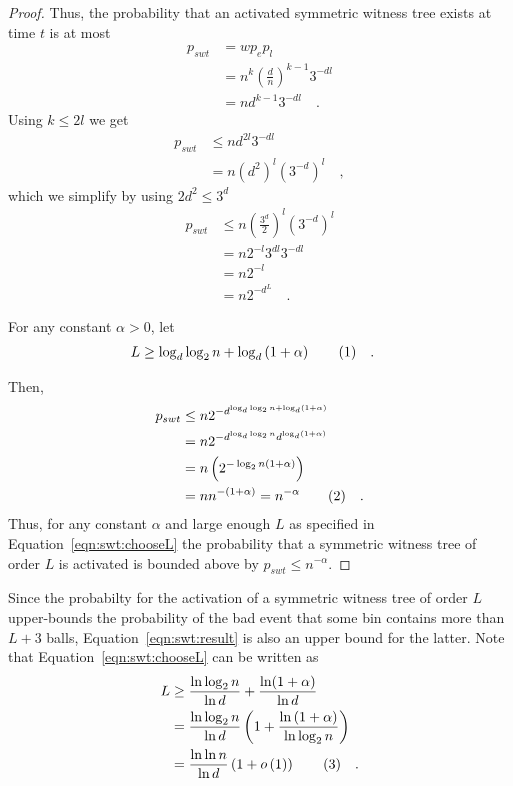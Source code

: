 \documentclass[a4paper,12pt]{article}
\newcommand\numberthis{\addtocounter{equation}{1}\tag{\theequation}}
\newcommand\neqn[1]{\numberthis\label{eqn:#1}}
\begin{document}
\begin{proof}
Thus, the probability that an activated symmetric witness tree exists at time $t$ is at most 
\begin{align*}
p_{swt} &= w  p_e  p_l \\
		&= n^{k}  \left(\frac{d}{n}\right)^{k-1}  3^{-d  l} \\
		&= n  d^{k-1}  3^{-d  l}\quad .
\end{align*}
Using $k \leq 2l$ we get
\begin{align*}
p_{swt} &\leq n  d^{2 l}  3^{-d  l} \\
		&= n  \left(d^2\right)^l  \left( 3^{-d} \right)^l\quad ,
\end{align*}
which we simplify by using $2d^2 \leq 3^d$
\begin{align*}
p_{swt} &\leq n  \left(\frac{3^d}{2}\right)^l  \left( 3^{-d}\right)^l \\
		&= n  2^{-l}  3^{d l}  3^{-d  l} \\
		&= n 2^{-l}		\\
		&= n 2^{-d^L} \quad .		
\end{align*}

For any constant $\alpha > 0 $, let
\begin{align*}
L &\geq \log_d\log_2 n + \log_d\left(1+\alpha\right) \neqn{swt:chooseL} \quad .
\end{align*}

Then, 
\begin{align*}
p_{swt} &\leq n  2^{{-d}^{\log_d\log_2 n + \log_d\left(1+\alpha\right)}} \\
		&= n  2^{-{d}^{\log_d\log_2 n} d^{\log_d \left(1+\alpha\right)}} \\
		&= n  \left( 2^{-\log_2 n  \left(1+ \alpha \right)} \right) \\
		&= n  n^{-\left(1+\alpha\right)} = n^{-\alpha} \neqn{swt:result}\quad .
\end{align*}
Thus, for any constant $\alpha$ and large enough $L$ as specified in Equation~\ref{eqn:swt:chooseL} the probability that a symmetric witness tree of order $L$ is activated is bounded above by $p_{swt }\leq n^{-\alpha}$.
\end{proof}

Since the probabilty for the activation of a symmetric witness tree of order $L$ upper-bounds the probability of the bad event that some bin contains more than $L+3$ balls, Equation~\ref{eqn:swt:result} is also an upper bound for the latter. Note that Equation~\ref{eqn:swt:chooseL} can be written as
\begin{align*}
L &\geq  \frac{\ln\log_2 n}{\ln d} + \frac{\ln(1+\alpha)}{\ln d} \\
   &= \frac{\ln \log_2 n}{\ln d}  \left(1 + \frac{\ln\left(1+\alpha\right)}{\ln \log_2 n}\right) \\
  &=  \frac{\ln \ln n}{\ln d}  \left( 1+ o\left( 1\right)\right) \neqn{swt:boundL} \quad .
\end{align*}
\end{document}
